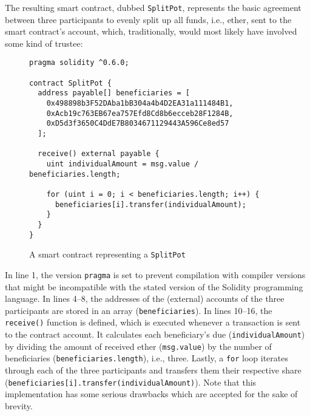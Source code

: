 The resulting smart contract, dubbed \texttt{SplitPot}, represents the basic agreement between three participants to evenly split up all funds, i.e., ether, sent to the smart contract's account, which, traditionally, would most likely have involved some kind of trustee:
\\
\begin{figure}[H]
\begin{lstlisting}
pragma solidity ^0.6.0;

contract SplitPot {
  address payable[] beneficiaries = [
    0x498898b3F52DAba1bB304a4b4D2EA31a111484B1,
    0xAcb19c763EB67ea757Efd8Cd8b6ecceb28F1284B,
    0xD5d3f3650C4DdE7B8034671129443A596Ce8ed57
  ];

  receive() external payable {
    uint individualAmount = msg.value / beneficiaries.length;
    
    for (uint i = 0; i < beneficiaries.length; i++) {
      beneficiaries[i].transfer(individualAmount);
    }
  }
}
\end{lstlisting}
\caption*{A smart contract representing a \texttt{SplitPot}}
\end{figure}

% 
% 
%     

In line 1, the version \texttt{pragma} is set to prevent compilation with compiler versions that might be incompatible with the stated version of the Solidity programming language.
In lines 4--8, the addresses of the (external) accounts of the three participants are stored in an array (\texttt{beneficiaries}).
In lines 10--16, the \texttt{receive()} function is defined, which is executed whenever a transaction is sent to the contract account.
It calculates each beneficiary's due (\texttt{individualAmount}) by dividing the amount of received ether (\texttt{msg.value}) by the number of beneficiaries (\texttt{beneficiaries.length}), i.e., three.
Lastly, a \texttt{for} loop iterates through each of the three participants and transfers them their respective share (\texttt{beneficiaries[i].transfer(individualAmount)}).
Note that this implementation has some serious drawbacks which are accepted for the sake of brevity.

